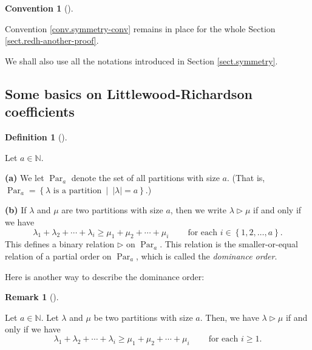 \documentclass[numbers=enddot,12pt,final,onecolumn,notitlepage]{scrartcl}%
\theoremstyle{definition}
\newtheorem{defi}[theo]{Definition}
\newenvironment{definition}[1][]
{\begin{defi}[#1]\begin{leftbar}}
{\end{leftbar}\end{defi}}
\newtheorem{remk}[theo]{Remark}
\newenvironment{remark}[1][]
{\begin{remk}[#1]\begin{leftbar}}
{\end{leftbar}\end{remk}}
\newtheorem{conv}[theo]{Convention}
\newenvironment{convention}[1][]
{\begin{conv}[#1]\begin{leftbar}}
{\end{leftbar}\end{conv}}
\newenvironment{convention}[1][Convention]{\noindent\textbf{#1.} }{\ \rule{0.5em}{0.5em}}
\newenvironment{convention}[1][Convention]{\noindent\textbf{#1.} }{\ \rule{0.5em}{0.5em}}
\begin{document}
\begin{convention}
Convention \ref{conv.symmetry-conv} remains in place for the whole Section
\ref{sect.redh-another-proof}.

We shall also use all the notations introduced in Section \ref{sect.symmetry}.
\end{convention}

\subsection{Some basics on Littlewood-Richardson coefficients}

\begin{definition}
\label{def.LRcoeffs.domi}Let $a\in\mathbb{N}$.

\textbf{(a)} We let $\operatorname*{Par}\nolimits_{a}$ denote the set of all
partitions with size $a$. (That is, $\operatorname*{Par}\nolimits_{a}=\left\{
\lambda\text{ is a partition}\ \mid\ \left\vert \lambda\right\vert =a\right\}
$.)

\textbf{(b)} If $\lambda$ and $\mu$ are two partitions with size $a$, then we
write $\lambda\triangleright\mu$ if and only if we have%
\[
\lambda_{1}+\lambda_{2}+\cdots+\lambda_{i}\geq\mu_{1}+\mu_{2}+\cdots+\mu
_{i}\ \ \ \ \ \ \ \ \ \ \text{for each }i\in\left\{  1,2,\ldots,a\right\}  .
\]
This defines a binary relation $\triangleright$ on $\operatorname*{Par}%
\nolimits_{a}$. This relation is the smaller-or-equal relation of a partial
order on $\operatorname*{Par}\nolimits_{a}$, which is called the
\textit{dominance order}.
\end{definition}

Here is another way to describe the dominance order:

\begin{remark}
\label{rmk.LRcoeffs.domi=domi}Let $a\in\mathbb{N}$. Let $\lambda$ and $\mu$ be
two partitions with size $a$. Then, we have $\lambda\triangleright\mu$ if and
only if we have%
\begin{equation}
\lambda_{1}+\lambda_{2}+\cdots+\lambda_{i}\geq\mu_{1}+\mu_{2}+\cdots+\mu
_{i}\ \ \ \ \ \ \ \ \ \ \text{for each }i\geq1.
\label{eq.rmk.LRcoeffs.domi=domi.1}%
\end{equation}

\end{remark}
\end{document}
